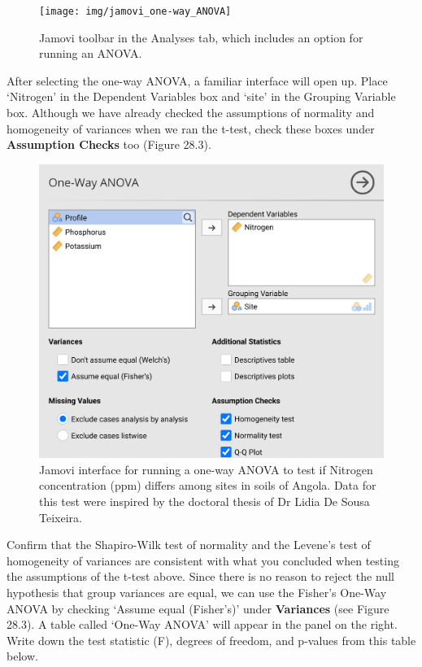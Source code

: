 \documentclass[
]{scrbook}
\begin{document}
\begin{figure}
\texttt{[image: img/jamovi\_one-way\_ANOVA]} \caption{Jamovi toolbar in the Analyses tab, which includes an option for running an ANOVA.}\label{fig:unnamed-chunk-128}
\end{figure}

After selecting the one-way ANOVA, a familiar interface will open up.
Place `Nitrogen' in the Dependent Variables box and `site' in the Grouping Variable box.
Although we have already checked the assumptions of normality and homogeneity of variances when we ran the t-test, check these boxes under \textbf{Assumption Checks} too (Figure 28.3).

\begin{figure}
\includegraphics[width=1\linewidth]{img/jamovi_one-way_ANOVA_analysis} \caption{Jamovi interface for running a one-way ANOVA to test if Nitrogen concentration (ppm) differs among sites in soils of Angola. Data for this test were inspired by the doctoral thesis of Dr Lidia De Sousa Teixeira.}\label{fig:unnamed-chunk-129}
\end{figure}

Confirm that the Shapiro-Wilk test of normality and the Levene's test of homogeneity of variances are consistent with what you concluded when testing the assumptions of the t-test above.
Since there is no reason to reject the null hypothesis that group variances are equal, we can use the Fisher's One-Way ANOVA by checking `Assume equal (Fisher's)' under \textbf{Variances} (see Figure 28.3).
A table called `One-Way ANOVA' will appear in the panel on the right.
Write down the test statistic (F), degrees of freedom, and p-values from this table below.
\end{document}
